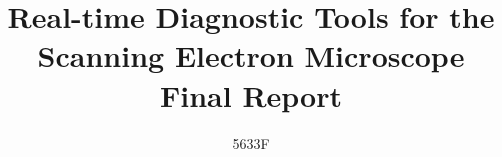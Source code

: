 \documentclass{article}
\title{Real-time Diagnostic Tools for the Scanning Electron Microscope Final Report}
\author{5633F}
\begin{document}
\maketitle

\newpage
\begin{thebibliography}{}
\end{thebibliography}
\end{document}
